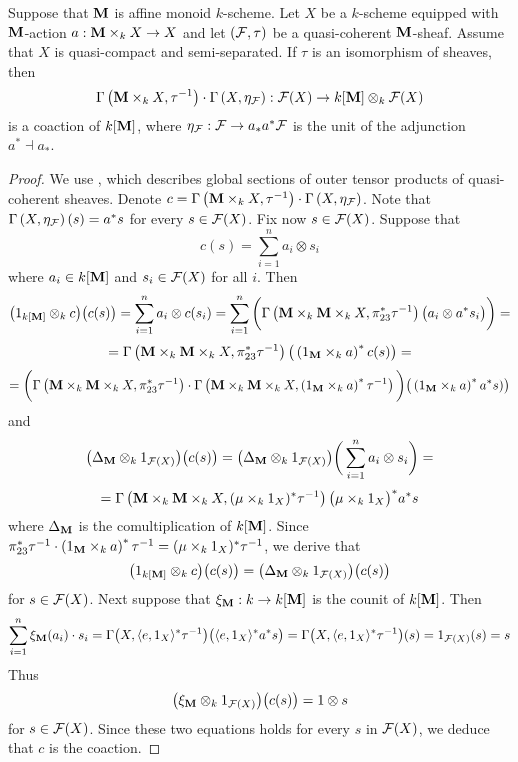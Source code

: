 \begin{proposition}\label{proposition:affine_monoid_actions_on_schemes_induce_coactions}
Suppose that $\mathbf{M}$ is affine monoid $k$-scheme. Let $X$ be a $k$-scheme equipped with $\mathbf{M}$-action $a:\mathbf{M}\times_kX\rightarrow X$ and let $({\mathcal F},\tau)$ be a quasi-coherent $\mathbf{M}$-sheaf. Assume that $X$ is quasi-compact and semi-separated. If $\tau$ is an isomorphism of sheaves, then 
$$\Gamma\left(\mathbf{M}\times_kX,\tau^{-1}\right)\cdot \Gamma\left( X,\eta_{{\mathcal F}} \right):{\mathcal F}(X) \rightarrow k[\mathbf{M}]\otimes_k {\mathcal F}(X)$$
is a coaction of $k[\mathbf{M}]$, where $\eta_{{\mathcal F}}:{\mathcal F} \rightarrow a_*a^*{\mathcal F}$ is the unit of the adjunction $a^* \dashv a_*$.
\end{proposition}
\begin{proof}
We use {\cite[Theorem 2.4]{Group_schemes_over_field}}, which describes global sections of outer tensor products of quasi-coherent sheaves. Denote $c = \Gamma\left(\mathbf{M}\times_kX,\tau^{-1}\right)\cdot \Gamma\left( X,\eta_{{\mathcal F}} \right)$. Note that $\Gamma\left(X,\eta_{{\mathcal F}}\right)(s) = a^*s$ for every $s\in {\mathcal F}(X)$. Fix now $s\in {\mathcal F}(X)$. Suppose that
$$c(s) = \sum_{i=1}^na_i\otimes s_i$$
where $a_i \in k[\mathbf{M}]$ and $s_i \in {\mathcal F}(X)$ for all $i$. Then
$$\big(1_{k[\mathbf{M}]}\otimes_k c\big)\big(c(s)\big) = \sum_{i=1}^na_i\otimes c(s_i) =  \sum_{i=1}^n\bigg( \Gamma\left(\mathbf{M}\times_k \mathbf{M} \times_kX, \pi_{23}^*\tau^{-1}\right)\big(a_i \otimes a^*s_i\big) \bigg) =$$
$$= \Gamma\left(\mathbf{M}\times_k \mathbf{M} \times_kX, \pi_{23}^*\tau^{-1}\right)\big(\left(1_{\mathbf{M}}\times_k a\right)^*c(s)\big) =$$
$$= \bigg(\Gamma\left(\mathbf{M}\times_k \mathbf{M} \times_kX, \pi_{23}^*\tau^{-1}\right) \cdot \Gamma\left(\mathbf{M} \times_k \mathbf{M} \times_k X, \left(1_{\mathbf{M}}\times_k a\right)^*\tau^{-1}\right)\bigg) \big(\left(1_{\mathbf{M}}\times_k a\right)^*a^*s)\big)$$
and
$$\big(\Delta_{\mathbf{M}}\otimes_k 1_{{\mathcal F}(X)}\big)\big(c(s)\big) = \big(\Delta_{\mathbf{M}}\otimes_k 1_{{\mathcal F}(X)}\big)\bigg(\sum_{i=1}^na_i\otimes s_i\bigg) =$$
$$=\Gamma\left(\mathbf{M}\times_k\mathbf{M}\times_kX, (\mu\times_k 1_X)^*\tau^{-1}\right)\big(\mu\times_k 1_X\big)^*a^*s$$
where $\Delta_{\mathbf{M}}$ is the comultiplication of $k[\mathbf{M}]$. Since $\pi_{23}^*\tau^{-1} \cdot \left(1_{\mathbf{M}}\times_k a\right)^*\tau^{-1} = (\mu\times_k 1_X)^*\tau^{-1}$, we derive that
$$\big(1_{k[\mathbf{M}]}\otimes_k c\big)\big(c(s)\big) = \big(\Delta_{\mathbf{M}}\otimes_k 1_{{\mathcal F}(X)}\big)\big(c(s)\big)$$
for $s\in {\mathcal F}(X)$. Next suppose that $\xi_{\mathbf{M}}:k\rightarrow k[\mathbf{M}]$ is the counit of $k[\mathbf{M}]$. Then
$$\sum_{i=1}^n \xi_{\mathbf{M}}(a_i) \cdot s_i = \Gamma\big(X, \langle e,1_X \rangle^*\tau^{-1}\big)\big(\langle e ,1_X\rangle^*a^*s\big) = \Gamma\big(X, \langle e,1_X \rangle^*\tau^{-1}\big)(s) = 1_{{\mathcal F}(X)}(s) = s$$
Thus
$$\big(\xi_{\mathbf{M}} \otimes_k 1_{{\mathcal F}(X)}\big)\big(c(s)\big) = 1\otimes s$$
for $s\in {\mathcal F}(X)$. Since these two equations holds for every $s$ in ${\mathcal F}(X)$, we deduce that $c$ is the coaction.
\end{proof}

